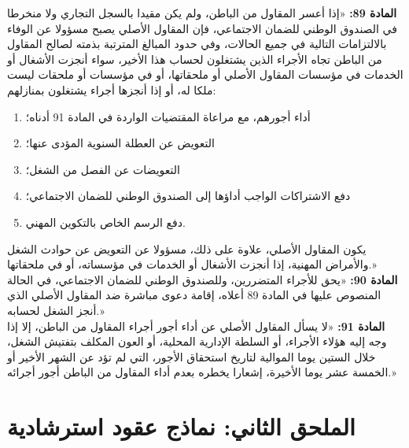 \begin{tcolorbox}[colback=lightgray, colframe=maincolor, arc=3pt, title={\textbf{المواد 89 و90 و91}}]
\textbf{المادة \textenglish{89}:} «إذا أعسر المقاول من الباطن، ولم يكن مقيدا بالسجل التجاري ولا منخرطا في الصندوق الوطني للضمان الاجتماعي، فإن المقاول الأصلي يصبح مسؤولا عن الوفاء بالالتزامات التالية في جميع الحالات، وفي حدود المبالغ المترتبة بذمته لصالح المقاول من الباطن تجاه الأجراء الذين يشتغلون لحساب هذا الأخير، سواء أنجزت الأشغال أو الخدمات في مؤسسات المقاول الأصلي أو ملحقاتها، أو في مؤسسات أو ملحقات ليست ملكا له، أو إذا أنجزها أجراء يشتغلون بمنازلهم:
\begin{enumerate}[itemsep=2pt]
    \item أداء أجورهم، مع مراعاة المقتضيات الواردة في المادة \textenglish{91} أدناه؛
    \item التعويض عن العطلة السنوية المؤدى عنها؛
    \item التعويضات عن الفصل من الشغل؛
    \item دفع الاشتراكات الواجب أداؤها إلى الصندوق الوطني للضمان الاجتماعي؛
    \item دفع الرسم الخاص بالتكوين المهني.
\end{enumerate}
يكون المقاول الأصلي، علاوة على ذلك، مسؤولا عن التعويض عن حوادث الشغل والأمراض المهنية، إذا أنجزت الأشغال أو الخدمات في مؤسساته، أو في ملحقاتها.»
\vspace{0.2cm}\\
\textbf{المادة \textenglish{90}:} «يحق للأجراء المتضررين، وللصندوق الوطني للضمان الاجتماعي، في الحالة المنصوص عليها في المادة \textenglish{89} أعلاه، إقامة دعوى مباشرة ضد المقاول الأصلي الذي أنجز الشغل لحسابه.»
\vspace{0.2cm}\\
\textbf{المادة \textenglish{91}:} «لا يسأل المقاول الأصلي عن أداء أجور أجراء المقاول من الباطن، إلا إذا وجه إليه هؤلاء الأجراء، أو السلطة الإدارية المحلية، أو العون المكلف بتفتيش الشغل، خلال الستين يوما الموالية لتاريخ استحقاق الأجور، التي لم تؤد عن الشهر الأخير أو الخمسة عشر يوما الأخيرة، إشعارا يخطره بعدم أداء المقاول من الباطن أجور أجرائه.»
\end{tcolorbox}

\chapter*{الملحق الثاني: نماذج عقود استرشادية}

